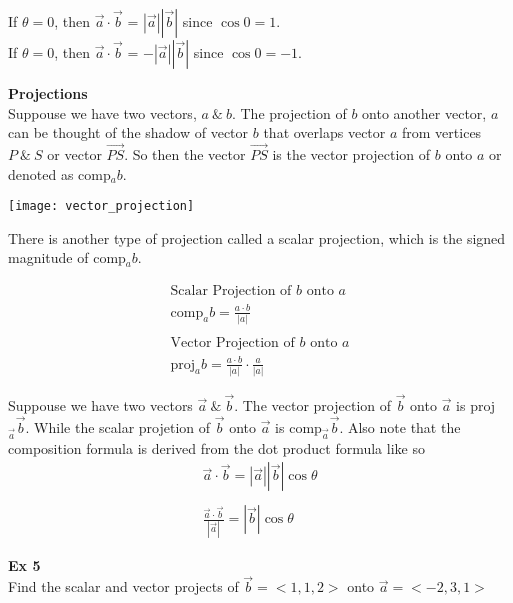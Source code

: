 \documentclass{article}
\begin{document}
  If $ \theta = 0 $, then $ \vec{ a } \cdot \vec{ b }   $ = $ | \vec{ a }  |  | \vec{ b }  |$ since $ \cos{0} = 1$.\\
  If $ \theta = 0 $, then $ \vec{ a } \cdot \vec{ b }   $ = $ -| \vec{ a }  |  | \vec{ b }  |$ since $ \cos{0} = -1$.

  \textbf{Projections}\\
  Suppouse we have two vectors, $ a ~\&~ b $. The projection of $ b $  onto another vector, $ a $ can be thought of the shadow of vector $ b $ that overlaps vector $ a $ from vertices $ P ~\&~ S $ or vector $ \vec{PS} $. So then the vector $ \vec{PS} $ is the vector projection of $ b $ onto $ a $ or denoted as comp$_{a}b$. 

  \begin{center}
    \texttt{[image: vector\_projection]}
  \end{center}

  There is another type of projection called a scalar projection, which is the signed magnitude of comp$_{a}b$. 

  \[
    \begin{gathered}
      \text{Scalar Projection of } b \text{ onto } a\\
      \text{comp}_{a}b = \frac{a \cdot b}{| a |}\\
      ~\\ 
    \text{Vector Projection of } b \text{ onto } a\\
    \text{proj}_{a}b = \frac{a \cdot b}{| a |} \cdot \frac{a}{| a |}
    \end{gathered}
  \]

  Suppouse we have two vectors $ \vec{a} ~\&~ \vec{b} $. The vector projection of $ \vec{b} $ onto $ \vec{a} $ is proj$ _{\vec{a}}\vec{b}  $. While the scalar projetion of $ \vec{b} $ onto $ \vec{a} $ is comp$ _{\vec{a}}\vec{b}$. Also note that the composition formula is derived from the dot product formula like so
  \[
    \begin{gathered}
     \vec{a} \cdot  \vec{b} = | \vec{a} | | \vec{b} | \cos{\theta}\\
     ~\\
     \frac{\vec{a} \cdot \vec{b}}{| \vec{a} |} = | \vec{b} | \cos{\theta}
    \end{gathered}
  \]

\textbf{Ex 5}\\
Find the scalar and vector projects of $  \vec{ b } = < 1, 1, 2>   $ onto $ \vec{ a } = < -2, 3, 1>   $   
\end{document}
